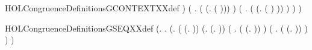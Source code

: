 \begin{SaveVerbatim}{HOLCongruenceDefinitionsGCONTEXTXXdef}
                       ) \HOLSymConst{\HOLTokenDisj{}}
                 (\HOLSymConst{\HOLTokenExists{}} . ( \HOLSymConst{=} (\HOLTokenLambda{}. \HOLConst{\ensuremath{\nu}}  ( ))) \HOLSymConst{\HOLTokenConj{}}  ) \HOLSymConst{\HOLTokenDisj{}}
                 (\HOLSymConst{\HOLTokenExists{}} .
                      ( \HOLSymConst{=} (\HOLTokenLambda{}.  ( ) )) \HOLSymConst{\HOLTokenConj{}}  ) \HOLSymConst{\HOLTokenImp{}}
                  ) \HOLSymConst{\HOLTokenImp{}}
             )
\end{SaveVerbatim}
\newcommand{\HOLCongruenceDefinitionsGCONTEXTXXdef}{\UseVerbatim{HOLCongruenceDefinitionsGCONTEXTXXdef}}
\begin{SaveVerbatim}{HOLCongruenceDefinitionsGSEQXXdef}
\HOLTokenTurnstile{}  \HOLSymConst{=}
   (\HOLTokenLambda{}.
        \HOLSymConst{\HOLTokenForall{}}.
            (\HOLSymConst{\HOLTokenForall{}}.
                 ( \HOLSymConst{=} (\HOLTokenLambda{}. )) \HOLSymConst{\HOLTokenDisj{}} (\HOLSymConst{\HOLTokenExists{}}.  \HOLSymConst{=} (\HOLTokenLambda{}. )) \HOLSymConst{\HOLTokenDisj{}}
                 (\HOLSymConst{\HOLTokenExists{}} . ( \HOLSymConst{=} (\HOLTokenLambda{}.  )) \HOLSymConst{\HOLTokenConj{}}  ) \HOLSymConst{\HOLTokenDisj{}}
                 (\HOLSymConst{\HOLTokenExists{}}   .
                      ( \HOLSymConst{=} (\HOLTokenLambda{}.   \HOLSymConst{\ensuremath{+}}  )) \HOLSymConst{\HOLTokenConj{}}
                        \HOLSymConst{\HOLTokenConj{}}  ) \HOLSymConst{\HOLTokenImp{}}
                  ) \HOLSymConst{\HOLTokenImp{}}
             )
\end{SaveVerbatim}
